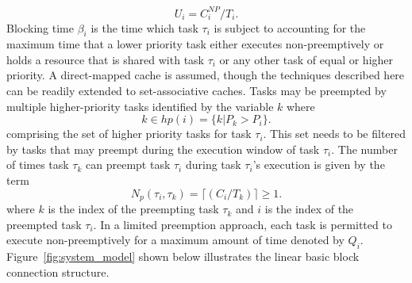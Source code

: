 \begin{equation}\label{eqn:u-task}
    U_{i} = C_{i}^{NP}/T_{i}.
\end{equation}
\noindent
Blocking time \begin{math}\beta_{i}\end{math} is the time which task \begin{math}\tau_{i}\end{math} is subject to accounting for the maximum time that a lower priority task either executes non-preemptively or holds a resource that is shared with task \begin{math}\tau_{i}\end{math} or any other task of equal or higher priority.
A direct-mapped cache is assumed, though the techniques described here can be readily extended to set-associative caches. Tasks may be preempted by multiple higher-priority tasks identified by the variable $k$ where
\begin{equation}\label{eqn:hp-tasks}
    k \in hp(i) = \{k | P_{k} > P_{i}\}.
\end{equation}
\noindent
comprising the set of higher priority tasks for task \begin{math}\tau_{i}\end{math}.  This set needs to be filtered by tasks that may preempt during the execution window of task \begin{math}\tau_{i}\end{math}.  The number of times task \begin{math}\tau_{k}\end{math} can preempt task \begin{math}\tau_{i}\end{math} during task \begin{math}\tau_{i}\end{math}'s execution is given by the term
\begin{equation}\label{eqn:num-preemptions}
    N_{p}(\tau_{i},\tau_{k})=\lceil(C_{i}/T_{k})\rceil \geq 1.
\end{equation}
\noindent
where $k$ is the index of the preempting task \begin{math}\tau_{k}\end{math} and $i$ is the index of the preempted task \begin{math}\tau_{i}\end{math}.  In a limited preemption approach, each task is permitted to execute non-preemptively for a maximum amount of time denoted by \begin{math}Q_{i}\end{math}.  Figure~\ref{fig:system_model} shown below illustrates the linear basic block connection structure.
